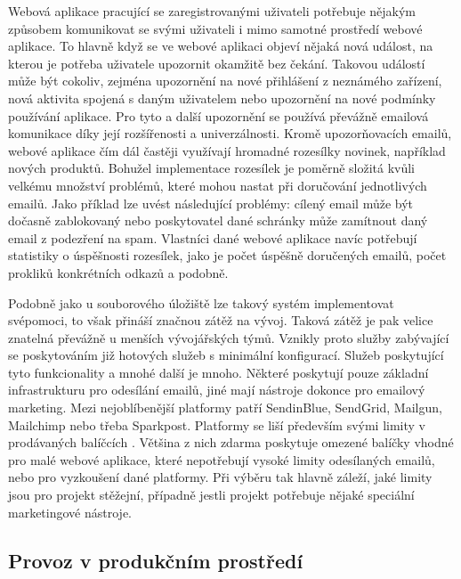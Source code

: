 	Webová aplikace pracující se zaregistrovanými uživateli potřebuje nějakým způsobem komunikovat se svými uživateli i
	mimo samotné prostředí webové aplikace.
	To hlavně když se ve webové aplikaci objeví nějaká nová událost, na kterou je potřeba uživatele upozornit
	okamžitě bez čekání.
	Takovou událostí může být cokoliv, zejména upozornění na nové přihlášení z neznámého zařízení, nová aktivita spojená
	s daným uživatelem nebo upozornění na nové podmínky používání aplikace.
	Pro tyto a další upozornění se používá převážně emailová komunikace díky její rozšířenosti a univerzálnosti.
	Kromě upozorňovacích emailů, webové aplikace čím dál častěji využívají hromadné rozesílky novinek,
	například nových produktů.
	Bohužel implementace rozesílek je poměrně složitá kvůli velkému množství problémů, které mohou nastat
	při doručování jednotlivých emailů.
	Jako příklad lze uvést následující problémy: cílený email může být dočasně zablokovaný nebo
	poskytovatel dané schránky může zamítnout daný email z podezření na spam.
	Vlastníci dané webové aplikace navíc potřebují statistiky o úspěšnosti rozesílek, jako je počet úspěšně doručených emailů,
	počet prokliků konkrétních odkazů a podobně.

	Podobně jako u souborového úložiště lze takový systém implementovat svépomoci, to však přináší značnou zátěž na vývoj.
	Taková zátěž je pak velice znatelná převážně u menších vývojářských týmů.
	Vznikly proto služby zabývající se poskytováním již hotových služeb s minimální konfigurací.
	Služeb poskytující tyto funkcionality a mnohé další je mnoho.
	Některé poskytují pouze základní infrastrukturu pro odesílání emailů, jiné mají nástroje dokonce pro emailový
	marketing.
	Mezi nejoblíbenější platformy patří SendinBlue, SendGrid, Mailgun, Mailchimp nebo třeba Sparkpost.
	Platformy se liší především svými limity v prodávaných balíčcích \cite{maily_1} \cite{maily_2}.
	Většina z nich zdarma poskytuje omezené balíčky vhodné pro malé webové aplikace, které nepotřebují vysoké limity odesílaných
	emailů, nebo pro vyzkoušení dané platformy.
	Při výběru tak hlavně záleží, jaké limity jsou pro projekt stěžejní, případně jestli projekt potřebuje nějaké speciální
	marketingové nástroje.

	\subsection{Provoz v produkčním prostředí}

